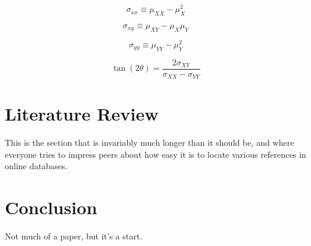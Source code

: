 \documentclass{article}
\newcommand{\sxx}{\ensuremath{\sigma_{xx}}}
\newcommand{\sxy}{\ensuremath{\sigma_{xy}}}
\newcommand{\syy}{\ensuremath{\sigma_{yy}}}
\begin{document}
\begin{equation}
\sxx \equiv \mu_{XX} - \mu_{X}^{2}
\end{equation}

\begin{equation}
\sxy \equiv \mu_{XY} - \mu_{X} \mu_{Y}
\end{equation}

\begin{equation}
\syy \equiv \mu_{YY} - \mu_{Y}^{2}
\end{equation}

\begin{equation}
\tan \left( 2 \theta \right) = \frac{2 \sigma_{XY}}{\sigma_{XX} - \sigma_{YY}}
\end{equation}

\section{Literature Review}
This is the section that is invariably much longer than it should be, and
where everyone tries to impress peers about how easy it is to locate various
references in online databases.

\section{Conclusion}
Not much of a paper, but it's a start.
\end{document}
